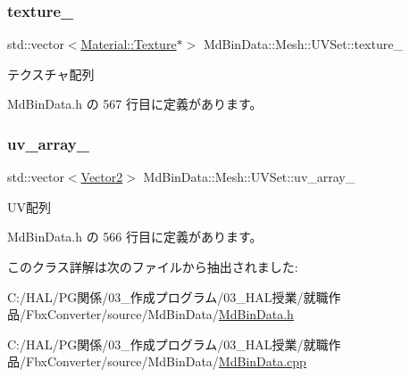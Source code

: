 \subsubsection{\texorpdfstring{texture\+\_\+}{texture\_}}
{\footnotesize\ttfamily std\+::vector$<$\mbox{\hyperlink{class_md_bin_data_1_1_material_1_1_texture}{Material\+::\+Texture}}$\ast$$>$ Md\+Bin\+Data\+::\+Mesh\+::\+U\+V\+Set\+::texture\+\_\+\hspace{0.3cm}{\ttfamily [private]}}



テクスチャ配列 



 Md\+Bin\+Data.\+h の 567 行目に定義があります。

\mbox{\label{class_md_bin_data_1_1_mesh_1_1_u_v_set_a536dede8f5757658f374d561473cb935}} 
\subsubsection{\texorpdfstring{uv\+\_\+array\+\_\+}{uv\_array\_}}
{\footnotesize\ttfamily std\+::vector$<$\mbox{\hyperlink{class_md_bin_data_1_1_vector2}{Vector2}}$>$ Md\+Bin\+Data\+::\+Mesh\+::\+U\+V\+Set\+::uv\+\_\+array\+\_\+\hspace{0.3cm}{\ttfamily [private]}}



U\+V配列 



 Md\+Bin\+Data.\+h の 566 行目に定義があります。



このクラス詳解は次のファイルから抽出されました\+:\begin{DoxyCompactItemize}
\item 
C\+:/\+H\+A\+L/\+P\+G関係/03\+\_\+作成プログラム/03\+\_\+\+H\+A\+L授業/就職作品/\+Fbx\+Converter/source/\+Md\+Bin\+Data/\mbox{\hyperlink{_md_bin_data_8h}{Md\+Bin\+Data.\+h}}\item 
C\+:/\+H\+A\+L/\+P\+G関係/03\+\_\+作成プログラム/03\+\_\+\+H\+A\+L授業/就職作品/\+Fbx\+Converter/source/\+Md\+Bin\+Data/\mbox{\hyperlink{_md_bin_data_8cpp}{Md\+Bin\+Data.\+cpp}}\end{DoxyCompactItemize}
